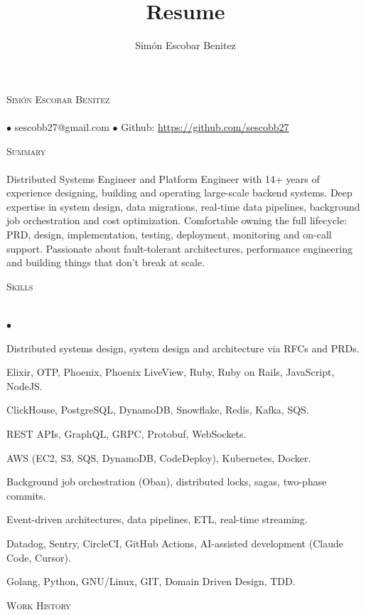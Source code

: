 \documentclass[a4paper]{article}
\title{Resume}
\author{Sim\'on Escobar Benitez}
\newcommand{\lineunder}{\vspace*{-8pt} \\ \hspace*{-18pt} \hrulefill \\}
\newcommand{\header}[1]{{\hspace*{-15pt}\vspace*{6pt}
  \textsc{#1}} \vspace*{-6pt} \lineunder}
\newcommand{\contact}[2]{
  \vspace*{-8pt}
  \begin{center}
  {\LARGE \scshape {#1}} \lineunder #2
  \end{center}
  \vspace*{-8pt} }
\newenvironment{achievements}{\begin{list}{$\bullet$}{\topsep 0pt \itemsep
  -2pt}}{\vspace*{4pt}\end{list}}
\begin{document}
  \small
  \smallskip
  \vspace*{-44pt}
  \contact{Sim\'on Escobar Benitez} { $\bullet$ sescobb27@gmail.com $\bullet$ Github: \url{https://github.com/sescobb27} }

  \header{Summary}
  Distributed Systems Engineer and Platform Engineer with 14+ years of experience designing, building and operating large-scale backend systems. Deep expertise in system design, data migrations, real-time data pipelines, background job orchestration and cost optimization. Comfortable owning the full lifecycle: PRD, design, implementation, testing, deployment, monitoring and on-call support. Passionate about fault-tolerant architectures, performance engineering and building things that don't break at scale.

  \header{Skills}
  \begin{achievements}
  \item {Distributed systems design, system design and architecture via RFCs and PRDs.}
  \item {Elixir, OTP, Phoenix, Phoenix LiveView, Ruby, Ruby on Rails, JavaScript, NodeJS.}
  \item {ClickHouse, PostgreSQL, DynamoDB, Snowflake, Redis, Kafka, SQS.}
  \item {REST APIs, GraphQL, GRPC, Protobuf, WebSockets.}
  \item {AWS (EC2, S3, SQS, DynamoDB, CodeDeploy), Kubernetes, Docker.}
  \item {Background job orchestration (Oban), distributed locks, sagas, two-phase commits.}
  \item {Event-driven architectures, data pipelines, ETL, real-time streaming.}
  \item {Datadog, Sentry, CircleCI, GitHub Actions, AI-assisted development (Claude Code, Cursor).}
  \item {Golang, Python, GNU/Linux, GIT, Domain Driven Design, TDD.}
  \end{achievements}

  \header{Work History}
\end{document}
